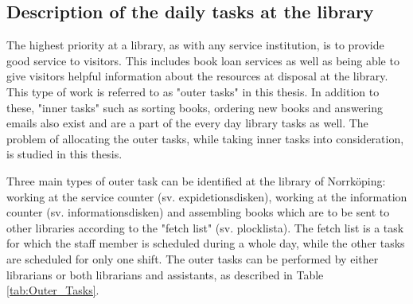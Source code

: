 \subsection{Description of the daily tasks at the library} \label{section:library_tasks}
The highest priority at a library, as with any service institution, is to provide good service to visitors. This includes book loan services as well as being able to give visitors helpful information about the resources at disposal at the library. This type of work is referred to as "outer tasks" in this thesis. In addition to these, "inner tasks" such as sorting books, ordering new books and answering emails also exist and are a part of the every day library tasks as well. The problem of allocating the outer tasks, while taking inner tasks into consideration, is studied in this thesis.

Three main types of outer task can be identified at the library of Norrköping: working at the service counter (sv. expidetionsdisken), working at the information counter (sv. informationsdisken) and assembling books which are to be sent to other libraries according to the "fetch list" (sv. plocklista). The fetch list is a task for which the staff member is scheduled during a whole day, while the other tasks are scheduled for only one shift. The outer tasks can be performed by either librarians or both librarians and assistants, as described in Table \ref{tab:Outer_Tasks}.

